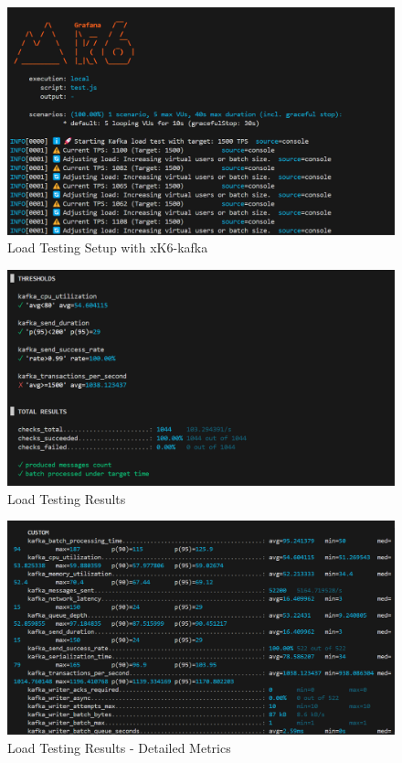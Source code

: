 \begin{figure}[h]
    \centering
    \includegraphics[width=1\textwidth]{metrics/k6-kafka-load-test.png}
    \caption{Load Testing Setup with xK6-kafka}
    \label{fig:load-test-setup}
\end{figure}


\begin{figure}[h]
    \centering
    \includegraphics[width=1\textwidth]{metrics/k6-bilan.png}
    \caption{Load Testing Results}
    \label{fig:load-test-results}
\end{figure}

\begin{figure}
    \centering
    \includegraphics[width=1\textwidth]{metrics/kafka-metrics.png}
    \caption{Load Testing Results - Detailed Metrics}
    \label{fig:load-test-detailed}
\end{figure}

